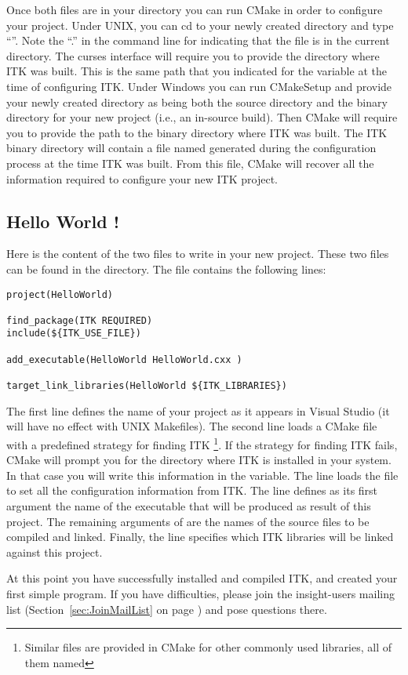 Once both files are in your directory you can run CMake in order to configure
your project. Under UNIX, you can cd to your newly created directory
and type ``''. Note the ``.'' in the command line for indicating
that the  file is in the current directory. The
curses interface will require you to provide the directory where ITK
was built. This is the same path that you indicated for the
 variable at the time of configuring ITK. Under
Windows you can run CMakeSetup and provide your newly created
directory as being both the source directory and the binary directory for
your new project (i.e., an in-source build). Then CMake will require you to
provide the path to the binary directory where ITK was built. The ITK binary
directory will contain a file named  generated during the
configuration process at the time ITK was built.  From this file, CMake will
recover all the information required to configure your new ITK project.

\subsection{Hello World !}
\label{sec:HelloWorldITK}


Here is the content of the two files to write in your new project. These two
files can be found in the  directory. The
 file contains the following lines:

\begin{verbatim}
project(HelloWorld)

find_package(ITK REQUIRED)
include(${ITK_USE_FILE})

add_executable(HelloWorld HelloWorld.cxx )

target_link_libraries(HelloWorld ${ITK_LIBRARIES})
\end{verbatim}

The first line defines the name of your project as it appears in Visual
Studio (it will have no effect with UNIX Makefiles). The second line loads a CMake
file with a predefined strategy for finding ITK \footnote{Similar files are
provided in CMake for other commonly used libraries, all of them named
}. If the strategy for finding ITK fails, CMake will prompt
you for the directory where ITK is installed in your system. In that case you
will write this information in the  variable. The line
 loads the  file to set
all the configuration information from ITK. The line 
defines as its first argument the name of the executable that will be produced
as result of this project. The remaining arguments of 
are the names of the source files to be compiled and linked.  Finally, the
 line specifies which ITK libraries will be
linked against this project.




At this point you have successfully installed and compiled ITK, and created
your first simple program. If you have difficulties, please join the
insight-users mailing list (Section~\ref{sec:JoinMailList} on page
\pageref{sec:JoinMailList}) and pose questions there.
